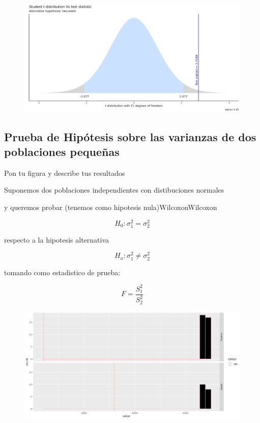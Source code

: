 \begin{figure}[!]
\centering
\includegraphics[width=\textwidth]{Img/cap2/pruebat_varianzasdiferentesFusarium_Shannon.png}
\caption{}
\end{figure}

\subsection{Prueba de Hipótesis sobre las varianzas de dos poblaciones pequeñas} 
Pon tu figura y describe tus resultados


Suponemos dos poblaciones independientes con distibuciones normales  

y queremos probar (tenemos como hipotesis nula)WilcoxonWilcoxon

$$H_{0} : \sigma_{1}^{2} = \sigma_{2}^{2}$$

respecto a la hipotesis alternativa

$$H_{a} : \sigma_{1}^{2} \neq \sigma_{2}^{2}$$

tomando como estadistico de prueba:

$$ F = \frac{S_{1}^{2}}{S_{2}^{2}}$$


\begin{figure}[!]
\centering
\includegraphics[width=\textwidth]{Img/cap2/varianzas_Chao1.png}
\caption{}
\end{figure}

